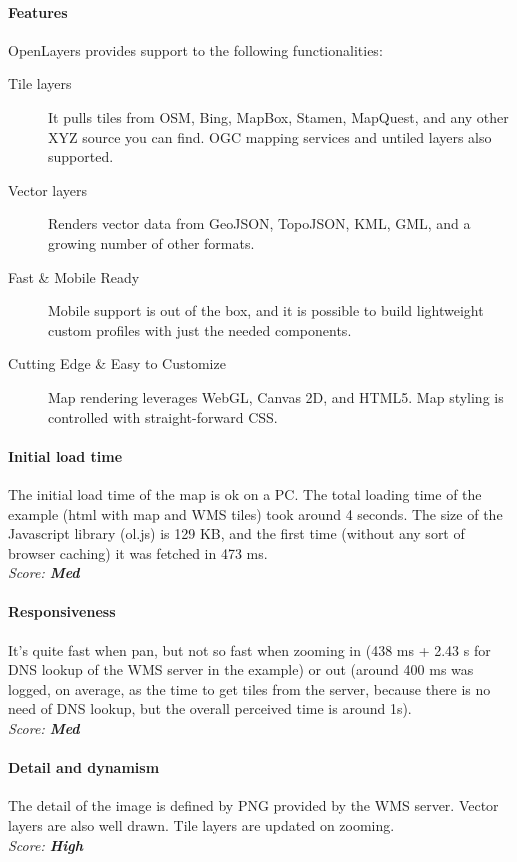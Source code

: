 \documentclass[11pt,a4paper,titlepage,oneside]{report}
\begin{document}
   \paragraph{Features}
   OpenLayers provides support to the following functionalities:
   \begin{description}
     \item[Tile layers] It pulls tiles from OSM, Bing, MapBox, Stamen, MapQuest, and any other XYZ source you can find. OGC mapping services and untiled layers also supported.
     \item[Vector layers] Renders vector data from GeoJSON, TopoJSON, KML, GML, and a growing number of other formats.
     \item[Fast \& Mobile Ready] Mobile support is out of the box, and it is possible to build lightweight custom profiles with just the needed components.
     \item[Cutting Edge \& Easy to Customize] Map rendering leverages WebGL, Canvas 2D, and HTML5. Map styling is controlled with straight-forward CSS.
   \end{description}
   \paragraph{Initial load time}
   The initial load time of the map is ok on a PC. The total loading time of the example (html with map and WMS tiles) took around 4 seconds. The size of the Javascript library (ol.js) is 129 KB, and the first time (without any sort of browser caching) it was fetched in 473 ms.
   \\ \emph{Score: \textbf{Med}}
   \paragraph{Responsiveness}
   It's quite fast when pan, but not so fast when zooming in (438 ms + 2.43 s for DNS lookup of the WMS server in the example) or out (around 400 ms was logged, on average, as the time to get tiles from the server, because there is no need of DNS lookup, but the overall perceived time is around 1s).
   \\ \emph{Score: \textbf{Med}}
   \paragraph{Detail and dynamism}
   The detail of the image is defined by PNG provided by the WMS server. Vector layers are also well drawn. Tile layers are updated on zooming.
   \\ \emph{Score: \textbf{High}}
\end{document}
